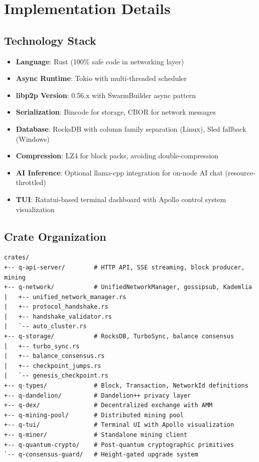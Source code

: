 \documentclass[11pt,a4paper]{article}
\begin{document}
\section{Implementation Details}

\subsection{Technology Stack}

\begin{itemize}
    \item \textbf{Language}: Rust (100\% safe code in networking layer)
    \item \textbf{Async Runtime}: Tokio with multi-threaded scheduler
    \item \textbf{libp2p Version}: 0.56.x with SwarmBuilder async pattern
    \item \textbf{Serialization}: Bincode for storage, CBOR for network messages
    \item \textbf{Database}: RocksDB with column family separation (Linux), Sled fallback (Windows)
    \item \textbf{Compression}: LZ4 for block packs, avoiding double-compression
    \item \textbf{AI Inference}: Optional llama-cpp integration for on-node AI chat (resource-throttled)
    \item \textbf{TUI}: Ratatui-based terminal dashboard with Apollo control system visualization
\end{itemize}

\subsection{Crate Organization}

\begin{verbatim}
crates/
+-- q-api-server/        # HTTP API, SSE streaming, block producer, mining
+-- q-network/           # UnifiedNetworkManager, gossipsub, Kademlia
|   +-- unified_network_manager.rs
|   +-- protocol_handshake.rs
|   +-- handshake_validator.rs
|   `-- auto_cluster.rs
+-- q-storage/           # RocksDB, TurboSync, balance consensus
|   +-- turbo_sync.rs
|   +-- balance_consensus.rs
|   +-- checkpoint_jumps.rs
|   `-- genesis_checkpoint.rs
+-- q-types/             # Block, Transaction, NetworkId definitions
+-- q-dandelion/         # Dandelion++ privacy layer
+-- q-dex/               # Decentralized exchange with AMM
+-- q-mining-pool/       # Distributed mining pool
+-- q-tui/               # Terminal UI with Apollo visualization
+-- q-miner/             # Standalone mining client
+-- q-quantum-crypto/    # Post-quantum cryptographic primitives
`-- q-consensus-guard/   # Height-gated upgrade system
\end{verbatim}
\end{document}
